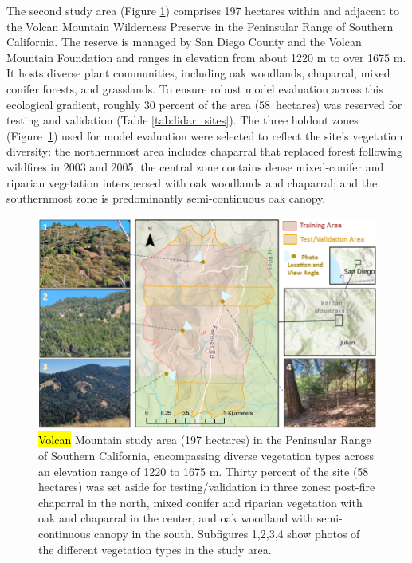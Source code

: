 \documentclass[remotesensing,article,accept,pdftex,moreauthors]{Definitions/mdpi}
\begin{document}
The second study area (Figure \ref{fig:volcan_mtn_study_area}) comprises 197 hectares within and adjacent to the Volcan Mountain Wilderness Preserve in the Peninsular Range of Southern California. The reserve is managed by San Diego County and the Volcan Mountain Foundation and ranges in elevation from about 1220 m to over 1675 m.
 It hosts diverse plant communities, including oak woodlands, chaparral, mixed conifer forests, and grasslands. To ensure robust model evaluation across this ecological gradient, roughly 30 percent of the area \mbox{(58 hectares)} was reserved for testing and validation (Table \ref{tab:lidar_sites}). The three holdout zones \mbox{(Figure \ref{fig:volcan_mtn_study_area})} used for model evaluation were selected to reflect the site’s vegetation diversity: the northernmost area includes chaparral that replaced forest following wildfires in 2003 and 2005; the central zone contains dense mixed-conifer and riparian vegetation interspersed with oak woodlands and chaparral; and the southernmost zone is predominantly semi-continuous oak canopy.


\begin{figure}[H]

    \includegraphics[width=0.98\linewidth]{figures/Volcan_Mtn_Study_Area.png}
    \caption{\hl{Volcan} %
 Mountain study area (197 hectares) in the Peninsular Range of Southern California, encompassing diverse vegetation types across an elevation range of 1220 to 1675 m. Thirty percent of the site (58 hectares) was set aside for testing/validation in three zones: post-fire chaparral in the north, mixed conifer and riparian vegetation with oak and chaparral in the center, and oak woodland with semi-continuous canopy in the south. Subfigures 1,2,3,4 show photos of the different vegetation types in the study area.}
    \label{fig:volcan_mtn_study_area}
\end{figure}
\end{document}
